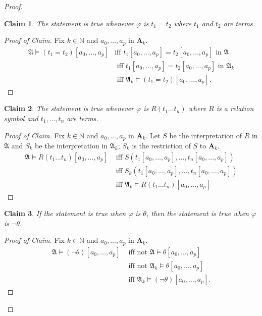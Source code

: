 \documentclass[titlepage, oneside]{amsbook}
\theoremstyle{plain}
\newtheorem*{claim}{Claim}
\theoremstyle{definition}
\theoremstyle{remark}
\newcommand{\ma}{\ensuremath{\mathfrak{A}}}
\newcommand{\ba}{\ensuremath{\mathbf{A}}}
\newcommand{\nat}{\ensuremath{\mathbb{N}}}
\newcommand{\anot}[2][0]{\ensuremath{ a_{#1} , \dots , a_{#2}}}
\newcommand{\tnot}[2][0]{\ensuremath{ t_{#1} , \dots , t_{#2}}}
\newcommand{\tnt}[2][0]{\ensuremath{ t_{#1}  \dots  t_{#2}}}
\begin{document}
\begin{proof}
\begin{claim}  The statement is true whenever $\varphi$ is $t_1 = t_2$
where $t_1$ and $t_2$ are terms.
\end{claim}

\begin{proof}[Proof of Claim] Fix $k \in \nat$ and $\anot p$ in
$\ba_k$.  \[ \begin{aligned} \ma \models (t_1 = t_2)[ \anot p ] &\mbox{
iff } t_1 [\anot p] = t_2 [ \anot p ]  \mbox{ in } \ma \\
&\mbox{ iff } t_1 [\anot p ] = t_2 [ \anot p ] \mbox{ in } \ma_k \\
&\mbox{ iff } \ma_k \models (t_1 = t_2 ) [\anot p ]. \end{aligned}\]
\renewcommand{\qedsymbol}{}
\end{proof}

\begin{claim}  The statement is true whenever $\varphi$ is $R(
\tnt[1]{n} ) $ where $R$ is a relation symbol and $\tnot[1]{n}$ are
terms.
\end{claim}

\begin{proof}[Proof of Claim]  Fix $k \in \nat$ and $\anot p$ in
$\ba_k$.  Let $S$ be the interpretation of $R$ in $\ma$ and $S_k$ be
the interpretation in $\ma_k$; $S_k$ is the restriction of $S$ to
$\ba_k$.  \[ \begin{aligned}  \ma \models R ( \tnt[1]{n} ) [\anot p ]
&\mbox{ iff } S (t_1 [ \anot p ] , \dots , t_n [\anot p ] ) \\
&\mbox{ iff } S_k (t_1 [ \anot p ] , \dots , t_n [\anot p ] )\\
&\mbox{ iff } \ma_k \models R ( \tnt[1]{n} ) [\anot p ]
\end{aligned} \]

\renewcommand{\qedsymbol}{}
\end{proof}


\begin{claim}  If the statement is true when $\varphi $ is $\theta$,
then the statement is true when $\varphi$ is $\neg \theta$.
\end{claim}

\begin{proof}[Proof of Claim]  Fix $k \in \nat$ and $\anot p$ in
$\ba_k$.  \[ \begin{aligned} \ma \models ( \neg \theta ) [ \anot p ]
&\mbox{ iff not } \ma \models \theta [ \anot p ] \\
&\mbox{ iff not } \ma_k \models \theta [ \anot p ] \\
&\mbox{ iff } \ma_k \models ( \neg \theta ) [ \anot p ]. \end{aligned}
\]
\renewcommand{\qedsymbol}{}
\end{proof}



\end{proof}
\end{document}
